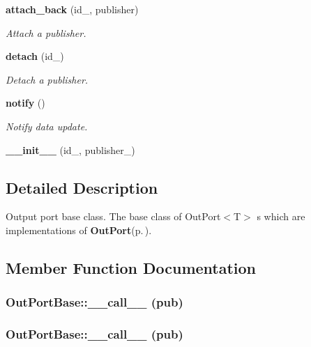 \begin{CompactItemize}
{\bf attach\_\-back} (id\_\-, publisher)
\begin{CompactList}\small\item\em Attach a publisher. \item\end{CompactList}\item 
{\bf detach} (id\_\-)
\begin{CompactList}\small\item\em Detach a publisher. \item\end{CompactList}\item 
{\bf notify} ()
\begin{CompactList}\small\item\em Notify data update. \item\end{CompactList}\item 
{\bf \_\-\_\-init\_\-\_\-} (id\_\-, publisher\_\-)
\end{CompactItemize}


\subsection{Detailed Description}
Output port base class. The base class of Out\-Port$<$T$>$ s which are implementations of {\bf Out\-Port}{\rm (p.\,\pageref{classOutPort})}. 



\subsection{Member Function Documentation}
\subsubsection{\setlength{\rightskip}{0pt plus 5cm}Out\-Port\-Base::\_\-\_\-call\_\-\_\- (pub)}\label{classOutPortBase_OutPortBasea7}


\subsubsection{\setlength{\rightskip}{0pt plus 5cm}Out\-Port\-Base::\_\-\_\-call\_\-\_\- (pub)}\label{classOutPortBase_OutPortBasea5}


